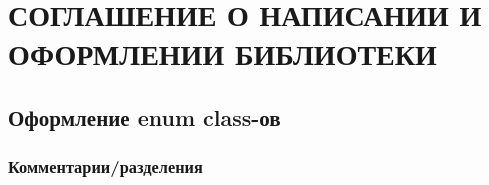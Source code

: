 \chapter{СОГЛАШЕНИЕ О НАПИСАНИИ И ОФОРМЛЕНИИ БИБЛИОТЕКИ}\label{logic:bib2}

\section{Оформление enum class-ов}
\subsection{Комментарии/разделения}
\fi
